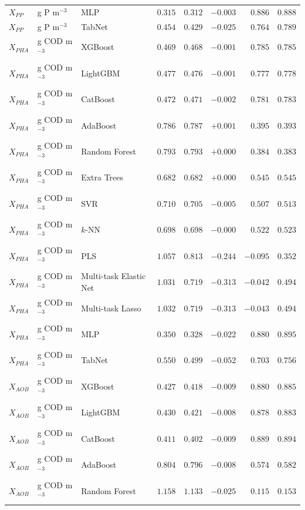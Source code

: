 \begin{longtable}{llp{3.1cm}rrrrr}
$X_{PP}$ & g P m$^{-3}$ & MLP & $0.315$ & $0.312$ & $-0.003$ & $0.886$ & $0.888$ \\
$X_{PP}$ & g P m$^{-3}$ & TabNet & $0.454$ & $0.429$ & $-0.025$ & $0.764$ & $0.789$ \\
$X_{PHA}$ & g COD m$^{-3}$ & XGBoost & $0.469$ & $0.468$ & $-0.001$ & $0.785$ & $0.785$ \\
$X_{PHA}$ & g COD m$^{-3}$ & LightGBM & $0.477$ & $0.476$ & $-0.001$ & $0.777$ & $0.778$ \\
$X_{PHA}$ & g COD m$^{-3}$ & CatBoost & $0.472$ & $0.471$ & $-0.002$ & $0.781$ & $0.783$ \\
$X_{PHA}$ & g COD m$^{-3}$ & AdaBoost & $0.786$ & $0.787$ & $+0.001$ & $0.395$ & $0.393$ \\
$X_{PHA}$ & g COD m$^{-3}$ & Random Forest & $0.793$ & $0.793$ & $+0.000$ & $0.384$ & $0.383$ \\
$X_{PHA}$ & g COD m$^{-3}$ & Extra Trees & $0.682$ & $0.682$ & $+0.000$ & $0.545$ & $0.545$ \\
$X_{PHA}$ & g COD m$^{-3}$ & SVR & $0.710$ & $0.705$ & $-0.005$ & $0.507$ & $0.513$ \\
$X_{PHA}$ & g COD m$^{-3}$ & $k$-NN & $0.698$ & $0.698$ & $-0.000$ & $0.522$ & $0.523$ \\
$X_{PHA}$ & g COD m$^{-3}$ & PLS & $1.057$ & $0.813$ & $-0.244$ & $-0.095$ & $0.352$ \\
$X_{PHA}$ & g COD m$^{-3}$ & Multi-task Elastic Net & $1.031$ & $0.719$ & $-0.313$ & $-0.042$ & $0.494$ \\
$X_{PHA}$ & g COD m$^{-3}$ & Multi-task Lasso & $1.032$ & $0.719$ & $-0.313$ & $-0.043$ & $0.494$ \\
$X_{PHA}$ & g COD m$^{-3}$ & MLP & $0.350$ & $0.328$ & $-0.022$ & $0.880$ & $0.895$ \\
$X_{PHA}$ & g COD m$^{-3}$ & TabNet & $0.550$ & $0.499$ & $-0.052$ & $0.703$ & $0.756$ \\
$X_{AOB}$ & g COD m$^{-3}$ & XGBoost & $0.427$ & $0.418$ & $-0.009$ & $0.880$ & $0.885$ \\
$X_{AOB}$ & g COD m$^{-3}$ & LightGBM & $0.430$ & $0.421$ & $-0.008$ & $0.878$ & $0.883$ \\
$X_{AOB}$ & g COD m$^{-3}$ & CatBoost & $0.411$ & $0.402$ & $-0.009$ & $0.889$ & $0.894$ \\
$X_{AOB}$ & g COD m$^{-3}$ & AdaBoost & $0.804$ & $0.796$ & $-0.008$ & $0.574$ & $0.582$ \\
$X_{AOB}$ & g COD m$^{-3}$ & Random Forest & $1.158$ & $1.133$ & $-0.025$ & $0.115$ & $0.153$ \\

\end{longtable}

